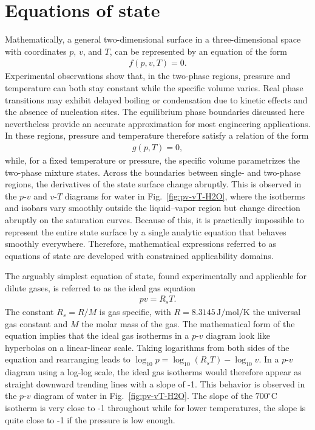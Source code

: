 \section{Equations of state}
Mathematically, a general two-dimensional surface in a three-dimensional space with coordinates $p$, $v$, and $T$, can be represented by an equation of the form
\begin{align}
    f(p,v,T)=0.
\end{align}
Experimental observations show that, in the two-phase regions, pressure and temperature can both stay constant while the specific volume varies. Real phase transitions may exhibit delayed boiling or condensation due to kinetic effects and the absence of nucleation sites. The equilibrium phase boundaries discussed here nevertheless provide an accurate approximation for most engineering applications. In these regions, pressure and temperature therefore satisfy a relation of the form
\begin{align}
    g(p,T)=0,
\end{align}
while, for a fixed temperature or pressure, the specific volume parametrizes the two-phase mixture states. Across the boundaries between single- and two-phase regions, the derivatives of the state surface change abruptly. This is observed in the $p$-$v$ and $v$-$T$ diagrams for water in Fig.~\ref{fig:pv-vT-H2O}, where the isotherms and isobars vary smoothly outside the liquid–vapor region but change direction abruptly on the saturation curves. Because of this, it is practically impossible to represent the entire state surface by a single analytic equation that behaves smoothly everywhere. Therefore, mathematical expressions referred to as equations of state are developed with constrained applicability domains. 

The arguably simplest equation of state, found experimentally and applicable for dilute gases, is referred to as the ideal gas equation 
\begin{align}
    pv=R_sT.
\end{align}
The constant $R_s=R/M$ is gas specific, with $R=8.3145\,\text{J}/\text{mol}/\text{K}$ the universal gas constant and $M$ the molar mass of the gas. The mathematical form of the equation implies that the ideal gas isotherms in a $p$-$v$ diagram look like hyperbolas on a linear-linear scale. Taking logarithms from both sides of the equation and rearranging leads to $\log_{10}p=\log_{10}(R_sT)-\log_{10}v$. In a $p$-$v$ diagram using a log-log scale, the ideal gas isotherms would therefore appear as straight downward trending lines with a slope of -1. This behavior is observed in the $p$-$v$ diagram of water in Fig.~\ref{fig:pv-vT-H2O}. The slope of the $700^\circ\text{C}$ isotherm is very close to -1 throughout while for lower temperatures, the slope is quite close to -1 if the pressure is low enough. 

